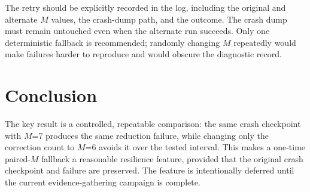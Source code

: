 \documentclass[11pt]{article}
\newcommand{\M}{\ensuremath{M}}
\begin{document}
The retry should be explicitly recorded in the log, including the original and alternate \M{} values, the crash-dump path, and the outcome.  The crash dump must remain untouched even when the alternate run succeeds.  Only one deterministic fallback is recommended; randomly changing \M{} repeatedly would make failures harder to reproduce and would obscure the diagnostic record.

\section{Conclusion}

The key result is a controlled, repeatable comparison: the same crash checkpoint with \M=7 produces the same reduction failure, while changing only the correction count to \M=6 avoids it over the tested interval.  This makes a one-time paired-\M{} fallback a reasonable resilience feature, provided that the original crash checkpoint and failure are preserved.  The feature is intentionally deferred until the current evidence-gathering campaign is complete.
\end{document}
